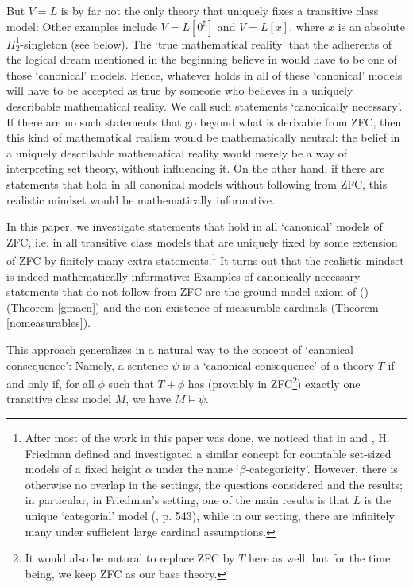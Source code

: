 \documentclass[a4paper,12pt]{amsart}
\theoremstyle{definition}
\begin{document}
But $V=L$ is by far not the only theory that uniquely fixes a transitive class model: Other examples include $V=L[0^{\sharp}]$ and $V=L[x]$, where $x$ is an absolute $\Pi^{1}_{2}$-singleton (see below).
The `true mathematical reality' that the adherents of the logical dream mentioned in the beginning believe in would have to be one of those `canonical' models. Hence, whatever holds in all of these `canonical' models
will have to be accepted as true by someone who believes in a uniquely describable mathematical reality. We call such statements `canonically necessary'.
If there are no such statements that go beyond what is derivable from ZFC, then this kind of mathematical realism would be mathematically neutral:
the belief in a uniquely describable mathematical reality would merely be a way of interpreting set theory, without influencing it. On the other hand, if there are statements that hold in all canonical models without
following from ZFC, this realistic mindset would be mathematically informative.

In this paper, we investigate statements that hold in all `canonical' models of ZFC, i.e. in all transitive class models that are uniquely fixed by some extension of ZFC by finitely many extra statements.\footnote{After most of the work in this paper was done, we noticed that in \cite{HFriedman1} and \cite{HFriedman2}, H. Friedman defined and investigated a similar concept for countable set-sized models of a fixed height $\alpha$ under the name `$\beta$-categoricity'. However, there is otherwise no overlap in the settings, the questions considered and the results; in particular, in Friedman's setting, one of the main results is that $L$ is the unique `categorial' model (\cite{HFriedman1}, p. 543), while in our setting, there are infinitely many under sufficient large cardinal assumptions.} 
It turns out that the realistic mindset is indeed mathematically informative: Examples of canonically necessary statements that do not follow from ZFC are the ground model axiom of (\cite{R}) (Theorem \ref{gmacn})
and the non-existence of measurable cardinals (Theorem \ref{nomeasurables}). 


This approach generalizes in a natural way to the concept of `canonical consequence': Namely, a sentence $\psi$ is a `canonical consequence' of a theory $T$ if and only if, for all $\phi$ such that $T+\phi$ has (provably in ZFC\footnote{It would also be natural to replace ZFC by $T$ here as well; but for the time being, we keep ZFC as our base theory.}) exactly one transitive class model $M$, we have $M\models\psi$. 
\end{document}
